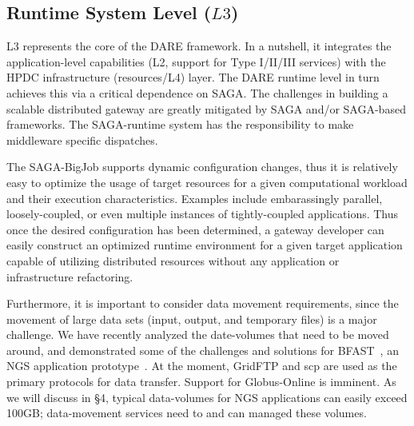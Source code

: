 \documentclass[]{svjour3}
\begin{document}
\subsection{Runtime System Level ($L3$)}

L3 represents the core of the DARE framework. In a nutshell, it
integrates the application-level capabilities (L2, support for Type
I/II/III services) with the HPDC infrastructure (resources/L4) layer. The DARE
runtime level in turn achieves this via a critical dependence on
SAGA. The challenges in building a scalable distributed gateway are
greatly mitigated by SAGA and/or SAGA-based frameworks. The
SAGA-runtime system has the responsibility to make middleware specific
dispatches.



The SAGA-BigJob supports dynamic configuration changes, thus it is
relatively easy to optimize the usage of target resources for a given
computational workload and their execution characteristics. Examples include
embarassingly parallel, loosely-coupled, or even multiple instances of
tightly-coupled applications. Thus once the desired configuration has
been determined, a gateway developer can easily construct an optimized
runtime environment for a given target application capable of
utilizing distributed resources without any application or
infrastructure refactoring.

Furthermore, it is important to consider data movement requirements,
since the movement of large data sets (input, output, and temporary
files) is a major challenge. We have recently analyzed the
date-volumes that need to be moved around, and demonstrated some of
the challenges and solutions for BFAST~\cite{dare-ecmls11}, an NGS
application prototype~. At the moment,
GridFTP and scp are used as the primary protocols for data
transfer. Support for Globus-Online is imminent. As we will discuss in
\S4, typical data-volumes for NGS applications can easily exceed
100GB; data-movement services need to and can managed these
volumes.~
\end{document}
